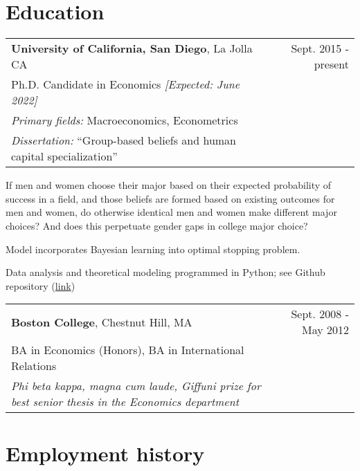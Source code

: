 \documentclass[10pt]{article}
\newcommand{\mysep}{\vspace{4pt}}
\begin{document}
 

\section*{Education}

\begin{tabularx}{\textwidth}{LR}
\textbf{University of California, San Diego}, La Jolla CA & Sept. 2015 - present
\\
Ph.D. Candidate in Economics \emph{[Expected: June 2022]} & 
\\
\emph{Primary fields:} Macroeconomics, Econometrics
\\
\emph{Dissertation:} ``Group-based beliefs and human capital specialization''
\end{tabularx} 
\begin{blist}
\item If men and women choose their major based on their expected probability of success in a field, and those beliefs are formed based on existing outcomes for men and women, do otherwise identical men and women make different major choices? And does this perpetuate gender gaps in college major choice?
\item Model incorporates Bayesian learning into optimal stopping problem. 
\item Data analysis and theoretical modeling programmed in Python; see Github repository (\href{https://github.com/tara-sullivan/hcs}{link})
\end{blist}

\mysep{}
\begin{tabularx}{\textwidth}{@{}Xr@{}}
\textbf{Boston College}, Chestnut Hill, MA & Sept. 2008 - May 2012 \\
BA in Economics (Honors), BA in International Relations
\\
\emph{Phi beta kappa, magna cum laude, Giffuni prize for best senior thesis in the Economics department}
\end{tabularx}

\mysep{}
\section*{Employment history}
\end{document}
